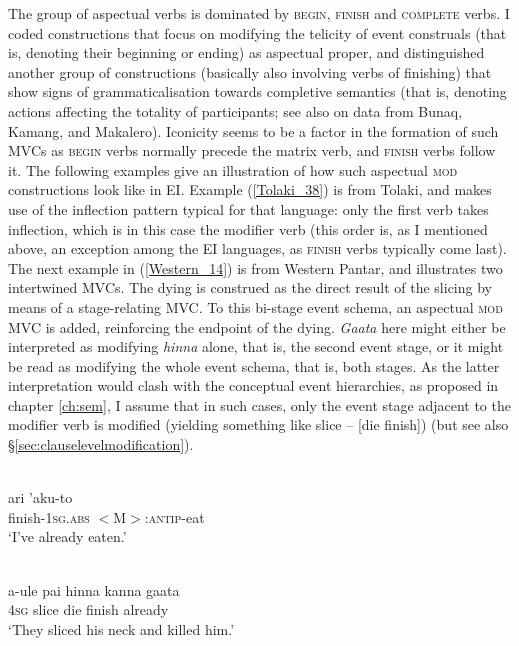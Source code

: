 The group of aspectual verbs is dominated by \textsc{begin}, \textsc{finish} and \textsc{complete} verbs. I coded constructions that focus on modifying the telicity of event construals (that is, denoting their beginning or ending) as aspectual proper, and distinguished another group of constructions (basically also involving verbs of finishing) that show signs of grammaticalisation towards completive semantics (that is, denoting actions affecting the totality of participants; see also \citealt{huber2014} on data from Bunaq, Kamang, and Makalero). Iconicity seems to be a factor in the formation of such MVCs as \textsc{begin} verbs normally precede the matrix verb, and \textsc{finish} verbs follow it. The following examples give an illustration of how such aspectual \textsc{mod} constructions look like in EI. Example (\ref{Tolaki_38}) is from Tolaki, and makes use of the inflection pattern typical for that language: only the first verb takes inflection, which is in this case the modifier verb (this order is, as I mentioned above, an exception among the EI  languages, as \textsc{finish} verbs typically come last). The next example in (\ref{Western_14}) is from Western Pantar, and illustrates two intertwined MVCs. The dying is construed as the direct result of the slicing by means of a stage-relating MVC. To this bi-stage event schema, an aspectual \textsc{mod} MVC is added, reinforcing the endpoint of the dying. \textit{Gaata} here might either be interpreted as modifying \textit{hinna} alone, that is, the second event stage, or it might be read as modifying the whole event schema, that is, both stages. As the latter interpretation would clash with the conceptual event hierarchies, as proposed in chapter \ref{ch:sem}, I assume that in such cases, only the event stage adjacent to the modifier verb is modified (yielding something like slice -- [die finish]) (but see also §\ref{sec:clauselevelmodification}).

\ea \label{Tolaki_38}
\\
\gll ari 'aku-to \\
finish-1\textsc{sg}.\textsc{abs} $<$M$>$:\textsc{antip}-eat \\
\glft `I've already eaten.'\\ 
\z

\ea \label{Western_14}
\\
\gll a-ule pai hinna kanna gaata \\
4\textsc{sg} slice die finish already \\
\glft `They sliced his neck and killed him.'\\ 
\z

